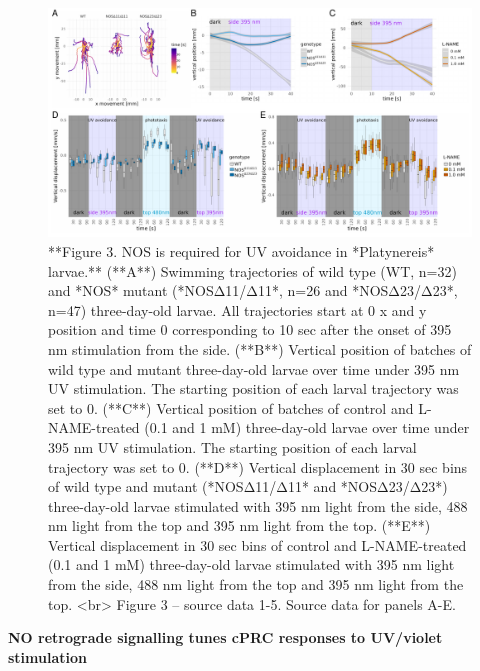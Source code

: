 \documentclass[
  10pt,
  onecolumn]{article}
\begin{document}
\begin{figure}
\includegraphics[width=33.33in]{figures/Fig3} \caption{**Figure 3. NOS is required for UV avoidance in *Platynereis* larvae.**  (**A**) Swimming trajectories of wild type (WT, n=32) and *NOS* mutant (*NOSΔ11/Δ11*, n=26 and *NOSΔ23/Δ23*, n=47) three-day-old larvae. All trajectories start at 0 x and y position and time 0 corresponding to 10 sec after the onset of 395 nm stimulation from the side. (**B**) Vertical position of batches of wild type and mutant three-day-old larvae over time under 395 nm UV stimulation. The starting position of each larval trajectory was set to 0. (**C**) Vertical position of batches of control and L-NAME-treated (0.1 and 1 mM) three-day-old larvae over time under 395 nm UV stimulation. The starting position of each larval trajectory was set to 0. (**D**) Vertical displacement in 30 sec bins of wild type and mutant (*NOSΔ11/Δ11* and *NOSΔ23/Δ23*) three-day-old larvae stimulated with 395 nm light from the side, 488 nm light from the top and 395 nm light from the top. (**E**) Vertical displacement in 30 sec bins of control and L-NAME-treated (0.1 and 1 mM) three-day-old larvae stimulated with 395 nm light from the side, 488 nm light from the top and 395 nm light from the top. <br> Figure 3 -- source data 1-5. Source data for panels A-E.}\label{fig:unnamed-chunk-3}
\end{figure}

\textbf{NO retrograde signalling tunes cPRC responses to UV/violet
stimulation}
\end{document}
